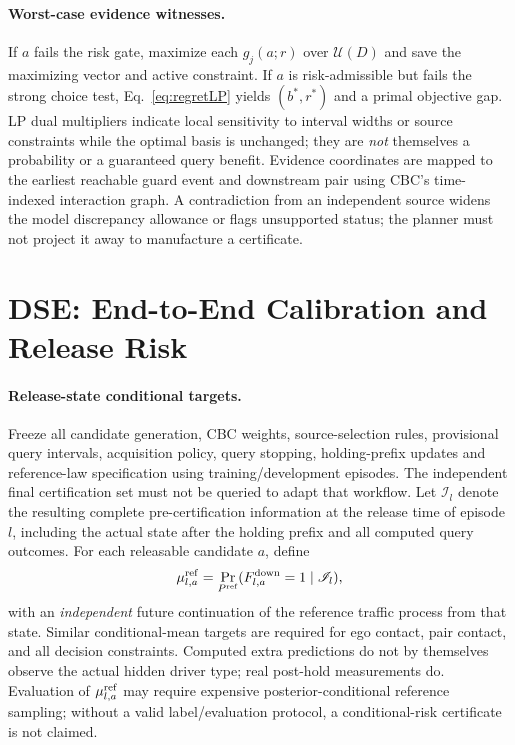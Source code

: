 \documentclass[10pt]{article}
\begin{document}
\paragraph{Worst-case evidence witnesses.}
If $a$ fails the risk gate, maximize each $g_j(a;r)$ over $\mathcal U(D)$ and save the maximizing vector and active constraint. If $a$ is risk-admissible but fails the strong choice test, Eq.~\eqref{eq:regretLP} yields $(b^*,r^*)$ and a primal objective gap. LP dual multipliers indicate local sensitivity to interval widths or source constraints while the optimal basis is unchanged; they are \emph{not} themselves a probability or a guaranteed query benefit. Evidence coordinates are mapped to the earliest reachable guard event and downstream pair using CBC's time-indexed interaction graph. A contradiction from an independent source widens the model discrepancy allowance or flags unsupported status; the planner must not project it away to manufacture a certificate.

\section{DSE: End-to-End Calibration and Release Risk}
\label{app:calibration}
\paragraph{Release-state conditional targets.}
Freeze all candidate generation, CBC weights, source-selection rules, provisional query intervals, acquisition policy, query stopping, holding-prefix updates and reference-law specification using training/development episodes. The independent final certification set must not be queried to adapt that workflow. Let $\mathscr I_l$ denote the resulting complete pre-certification information at the release time of episode $l$, including the actual state after the holding prefix and all computed query outcomes. For each releasable candidate $a$, define
\begin{equation}
 \mu_{l,a}^{\rm ref}=\Pr_{P^{\rm ref}}(F_{l,a}^{\rm down}=1\mid\mathscr I_l),
 \label{eq:releasedrisk}
\end{equation}
with an \emph{independent} future continuation of the reference traffic process from that state. Similar conditional-mean targets are required for ego contact, pair contact, and all decision constraints. Computed extra predictions do not by themselves observe the actual hidden driver type; real post-hold measurements do. Evaluation of $\mu_{l,a}^{\rm ref}$ may require expensive posterior-conditional reference sampling; without a valid label/evaluation protocol, a conditional-risk certificate is not claimed.
\end{document}
